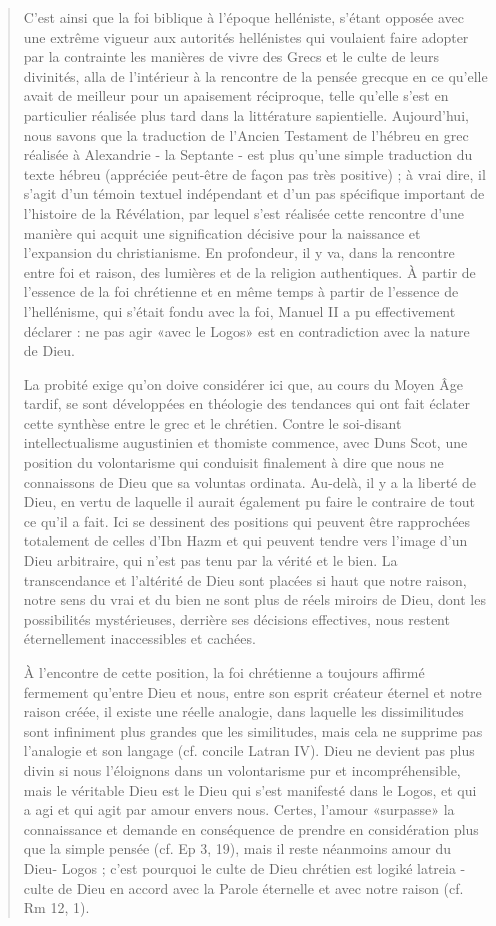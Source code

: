 \begin{quote}
C'est ainsi que la foi biblique à l'époque helléniste, s'étant opposée avec une extrême vigueur aux autorités hellénistes qui voulaient faire adopter par la contrainte les manières de vivre des Grecs et le culte de leurs divinités, alla de l'intérieur à la rencontre de la pensée grecque en ce qu'elle avait de meilleur pour un apaisement réciproque, telle qu'elle s'est en particulier réalisée plus tard dans la littérature sapientielle. Aujourd'hui, nous savons que la traduction de l'Ancien Testament de l'hébreu en grec réalisée à Alexandrie - la Septante - est plus qu'une simple traduction du texte hébreu (appréciée peut-être de façon pas très positive) ; à vrai dire, il s'agit d'un témoin textuel indépendant et d'un pas spécifique important de l'histoire de la Révélation, par lequel s'est réalisée cette rencontre d'une manière qui acquit une signification décisive pour la naissance et l'expansion du christianisme. En profondeur, il y va, dans la rencontre entre foi et raison, des lumières et de la religion authentiques. À partir de l'essence de la foi chrétienne et en même temps à partir de l'essence de l'hellénisme, qui s'était fondu avec la foi, Manuel II a pu effectivement déclarer : ne pas agir «avec le Logos» est en contradiction avec la nature de Dieu.

La probité exige qu'on doive considérer ici que, au cours du Moyen Âge tardif, se sont développées en théologie des tendances qui ont fait éclater cette synthèse entre le grec et le chrétien. Contre le soi-disant intellectualisme augustinien et thomiste commence, avec Duns Scot, une position du volontarisme qui conduisit finalement à dire que nous ne connaissons de Dieu que sa voluntas ordinata. Au-delà, il y a la liberté de Dieu, en vertu de laquelle il aurait également pu faire le contraire de tout ce qu'il a fait. Ici se dessinent des positions qui peuvent être rapprochées totalement de celles d'Ibn Hazm et qui peuvent tendre vers l'image d'un Dieu arbitraire, qui n'est pas tenu par la vérité et le bien. La transcendance et l'altérité de Dieu sont placées si haut que notre raison, notre sens du vrai et du bien ne sont plus de réels miroirs de Dieu, dont les possibilités mystérieuses, derrière ses décisions effectives, nous restent éternellement inaccessibles et cachées.

À l'encontre de cette position, la foi chrétienne a toujours affirmé fermement qu'entre Dieu et nous, entre son esprit créateur éternel et notre raison créée, il existe une réelle analogie, dans laquelle les dissimilitudes sont infiniment plus grandes que les similitudes, mais cela ne supprime pas l'analogie et son langage (cf. concile Latran IV). Dieu ne devient pas plus divin si nous l'éloignons dans un volontarisme pur et incompréhensible, mais le véritable Dieu est le Dieu qui s'est manifesté dans le Logos, et qui a agi et qui agit par amour envers nous. Certes, l'amour «surpasse» la connaissance et demande en conséquence de prendre en considération plus que la simple pensée (cf. Ep 3, 19), mais il reste néanmoins amour du Dieu- Logos ; c'est pourquoi le culte de Dieu chrétien est logiké latreia - culte de Dieu en accord avec la Parole éternelle et avec notre raison (cf. Rm 12, 1).


\end{quote}
